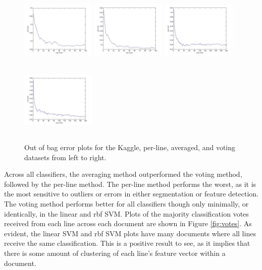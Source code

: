 \documentclass[paper=a4, fontsize=11pt]{scrartcl} %
\numberwithin{equation}{section} %
\numberwithin{figure}{section} %
\numberwithin{table}{section} %
\begin{document}
\begin{figure}
  \centering
  \includegraphics[width=1.4in,height=1.4in]{randforestKaggle_oob.jpg}
  \includegraphics[width=1.4in,height=1.4in]{randforestOurs_oob.jpg}
  \includegraphics[width=1.4in,height=1.4in]{randforestAvg_oob.jpg}
  \includegraphics[width=1.4in,height=1.4in]{randforestVote_oob.jpg}
  \caption{Out of bag error plots for the Kaggle, per-line, averaged,
    and voting datasets from left to right.}
  \label{fig:oob}
\end{figure}

Across all classifiers, the averaging method outperformed the voting
method, followed by the per-line method. The per-line method performs
the worst, as it is the most sensitive to outliers or errors in either
segmentation or feature detection. The voting method performs better
for all classifiers though only minimally, or identically, in the
linear and rbf SVM. Plots of the majority classification votes
received from each line across each document are shown in Figure
\ref{fig:votes}. As evident, the linear SVM and rbf SVM plots have
many documents where all lines receive the same classification. This
is a positive result to see, as it implies that there is some amount
of clustering of each line's feature vector within a document.
\end{document}
